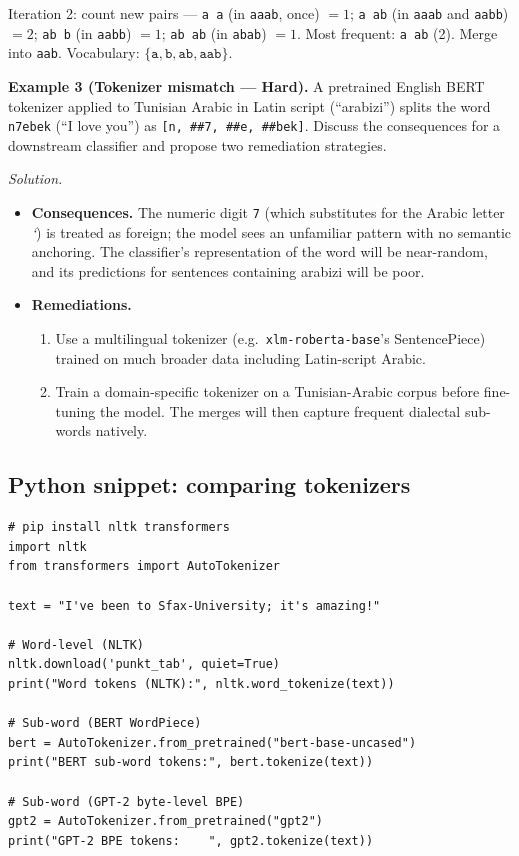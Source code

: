 Iteration 2: count new pairs --- \texttt{a\,a} (in \texttt{aaab}, once) $= 1$; \texttt{a\,ab} (in \texttt{aaab} and \texttt{aabb}) $= 2$; \texttt{ab\,b} (in \texttt{aabb}) $= 1$; \texttt{ab\,ab} (in \texttt{abab}) $= 1$.
Most frequent: \texttt{a\,ab} (2). Merge into \texttt{aab}. Vocabulary: $\{\texttt{a}, \texttt{b}, \texttt{ab}, \texttt{aab}\}$.

\medskip

\textbf{Example 3 (Tokenizer mismatch --- Hard).}
A pretrained English BERT tokenizer applied to Tunisian Arabic in Latin script (``arabizi'') splits the word \texttt{n7ebek} (``I love you'') as \texttt{[n, \#\#7, \#\#e, \#\#bek]}. Discuss the consequences for a downstream classifier and propose two remediation strategies.

\textit{Solution.}
\begin{itemize}
    \item \textbf{Consequences.} The numeric digit \texttt{7} (which substitutes for the Arabic letter \emph{`}) is treated as foreign; the model sees an unfamiliar pattern with no semantic anchoring. The classifier's representation of the word will be near-random, and its predictions for sentences containing arabizi will be poor.
    \item \textbf{Remediations.}
    \begin{enumerate}
        \item Use a multilingual tokenizer (e.g.\ \texttt{xlm-roberta-base}'s SentencePiece) trained on much broader data including Latin-script Arabic.
        \item Train a domain-specific tokenizer on a Tunisian-Arabic corpus before fine-tuning the model. The merges will then capture frequent dialectal sub-words natively.
    \end{enumerate}
\end{itemize}

\subsection{Python snippet: comparing tokenizers}

\begin{lstlisting}
# pip install nltk transformers
import nltk
from transformers import AutoTokenizer

text = "I've been to Sfax-University; it's amazing!"

# Word-level (NLTK)
nltk.download('punkt_tab', quiet=True)
print("Word tokens (NLTK):", nltk.word_tokenize(text))

# Sub-word (BERT WordPiece)
bert = AutoTokenizer.from_pretrained("bert-base-uncased")
print("BERT sub-word tokens:", bert.tokenize(text))

# Sub-word (GPT-2 byte-level BPE)
gpt2 = AutoTokenizer.from_pretrained("gpt2")
print("GPT-2 BPE tokens:    ", gpt2.tokenize(text))
\end{lstlisting}

